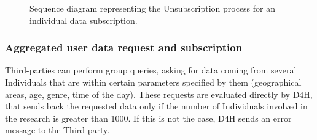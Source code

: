             \begin{figure}[H]
                \centering
                \caption{Sequence diagram representing the Unsubscription process for an individual data subscription.}
                \label{fig:Individual-request-unsubscription-process-sequence-diagram}
            \end{figure}
            
        \subsubsection{Aggregated user data request and subscription}
            Third-parties can perform group queries, asking for data coming from several Individuals that are within certain parameters specified by them (geographical areas, age, genre, time of the day). These requests are evaluated directly by D4H, that sends back the requested data only if the number of Individuals involved in the research is greater than 1000. If this is not the case, D4H sends an error message to the Third-party.

